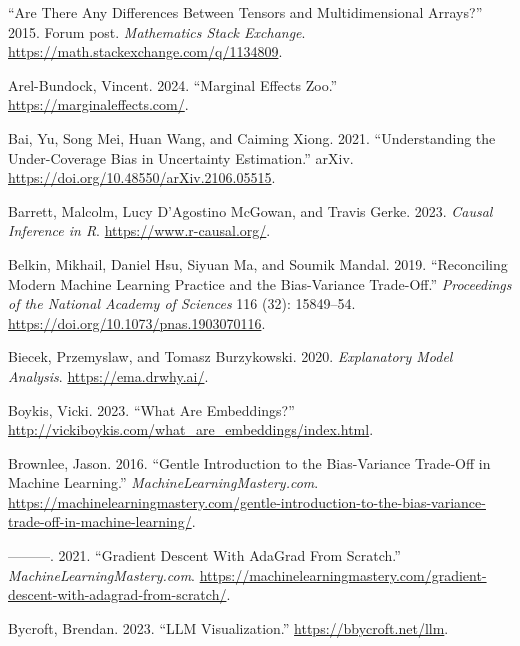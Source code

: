 \documentclass[
  letterpaper,
]{krantz}
\newlength{\cslhangindent}
\newenvironment{CSLReferences}[2] %
 {\begin{list}{}{%
  \setlength{\itemindent}{0pt}
  \setlength{\leftmargin}{0pt}
  \setlength{\parsep}{0pt}
  \ifodd #1
   \setlength{\leftmargin}{\cslhangindent}
   \setlength{\itemindent}{-1\cslhangindent}
  \fi
  \setlength{\itemsep}{#2\baselineskip}}}
 {\end{list}}
\begin{document}
\label{refs}
\begin{CSLReferences}{1}{0}
{``Are There Any Differences Between Tensors and Multidimensional
Arrays?''} 2015. Forum post. \emph{Mathematics Stack Exchange}.
\url{https://math.stackexchange.com/q/1134809}.

Arel-Bundock, Vincent. 2024. {``Marginal {Effects} {Zoo}.''}
\url{https://marginaleffects.com/}.

Bai, Yu, Song Mei, Huan Wang, and Caiming Xiong. 2021. {``Understanding
the {Under}-{Coverage} {Bias} in {Uncertainty} {Estimation}.''} arXiv.
\url{https://doi.org/10.48550/arXiv.2106.05515}.

Barrett, Malcolm, Lucy D'Agostino McGowan, and Travis Gerke. 2023.
\emph{Causal {Inference} in {R}}. \url{https://www.r-causal.org/}.

Belkin, Mikhail, Daniel Hsu, Siyuan Ma, and Soumik Mandal. 2019.
{``Reconciling Modern Machine Learning Practice and the Bias-Variance
Trade-Off.''} \emph{Proceedings of the National Academy of Sciences} 116
(32): 15849--54. \url{https://doi.org/10.1073/pnas.1903070116}.

Biecek, Przemyslaw, and Tomasz Burzykowski. 2020. \emph{Explanatory
{Model} {Analysis}}. \url{https://ema.drwhy.ai/}.

Boykis, Vicki. 2023. {``What Are Embeddings?''}
\url{http://vickiboykis.com/what_are_embeddings/index.html}.

Brownlee, Jason. 2016. {``Gentle {Introduction} to the {Bias}-{Variance}
{Trade}-{Off} in {Machine} {Learning}.''}
\emph{MachineLearningMastery.com}.
\url{https://machinelearningmastery.com/gentle-introduction-to-the-bias-variance-trade-off-in-machine-learning/}.

---------. 2021. {``Gradient {Descent} {With} {AdaGrad} {From}
{Scratch}.''} \emph{MachineLearningMastery.com}.
\url{https://machinelearningmastery.com/gradient-descent-with-adagrad-from-scratch/}.

Bycroft, Brendan. 2023. {``{LLM} {Visualization}.''}
\url{https://bbycroft.net/llm}.


\end{CSLReferences}
\end{document}
